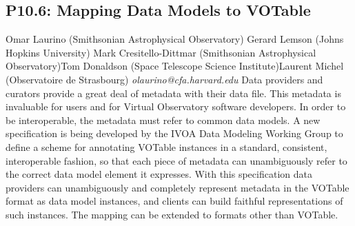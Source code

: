\documentclass{report}
\begin{document}
\subsection*{P10.6: Mapping Data Models to VOTable}
\bigskip
Omar Laurino (Smithsonian Astrophysical Observatory) \newline Gerard Lemson (Johns Hopkins University) \newline  Mark Cresitello-Dittmar (Smithsonian Astrophysical Observatory)\newline  Tom Donaldson (Space Telescope Science Institute)\newline Laurent Michel (Observatoire de Strasbourg)\newline  \newline\newline
{\it olaurino@cfa.harvard.edu}\newline
\newline\newline
Data providers and curators provide a great deal of metadata with their data file. This metadata is invaluable for users and for Virtual Observatory software developers. In order to be interoperable, the metadata must refer to common data models. A new specification is being developed by the IVOA Data Modeling Working Group to define a scheme for annotating VOTable instances in a standard, consistent, interoperable fashion, so that each piece of metadata can unambiguously refer to the correct data model element it expresses. With this specification data providers can unambiguously and completely represent metadata in the VOTable format as data model instances, and clients can build faithful representations of such instances. The mapping can be extended to formats other than VOTable.\newline
\newpage
\end{document}
